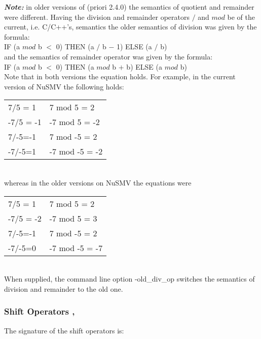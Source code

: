 \textbf{\textit{Note:}}\label{Old division semantics}
in older versions of \nusmv (priori 2.4.0)
the semantics of quotient and remainder were different.  Having the
division and remainder operators $/$ and $mod$ be of the current, i.e.
C/C++'s, semantics the older semantics of division was given by
the formula:\\
\indent IF (a $mod$  b $<$ 0) THEN (a $/$ b $-$ 1) ELSE (a $/$ b)\\
and the semantics of remainder operator was given by the formula:\\
\indent IF (a $mod$  b $<$ 0) THEN (a $mod$ b $+$ b) ELSE (a $mod$ b)\\
Note that in both versions the equation 
holds. For example, in the current version of NuSMV the following
holds:\\
\begin{tabular}{ll}
 7/5 = 1   &  7 mod 5 = 2\\
 -7/5 = -1 & -7 mod 5 = -2\\
 7/-5=-1   &  7 mod -5 = 2\\
 -7/-5=1   & -7 mod -5 = -2
\end{tabular}\\
whereas in the older versions on NuSMV the equations were\\
\begin{tabular}{ll}
 7/5 = 1   &  7 mod 5 = 2\\
 -7/5 = -2 & -7 mod 5 = 3\\
 7/-5=-1   &  7 mod -5 = 2\\
 -7/-5=0   & -7 mod -5 = -7
\end{tabular}\\
When supplied, the command line option -old\_div\_op switches the
semantics of division and remainder to the old one.

\subsubsection{Shift Operators \operator{<<}, \operator{>>}}
\label{Shift Operators}

The signature of the shift %
operators is:\\

